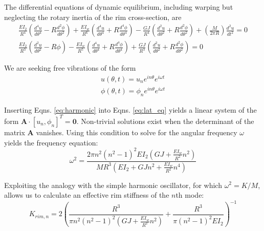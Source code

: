 \documentclass[../thesis.tex]{subfiles}
\begin{document}
The differential equations of dynamic equilibrium, including warping but neglecting the rotary inertia of the rim cross-section, are
  \begin{subequations}\label{eq:lat_eq}
  \begin{align}
  \frac{EI_{2}}{R^4}\left(\frac{d^4u}{d\theta^4}-R\frac{d^2\phi}{d\theta^2}\right) +
  \frac{EI_w}{R^6} \left(\frac{d^4u}{d\theta^4}+R\frac{d^4\phi}{d\theta^4}\right) -
  \frac{GJ}{R^4}\left(\frac{d^2u}{d\theta^2}+R\frac{d^2\phi}{d\theta^2}\right) +
  \left(\frac{M}{2\pi R}\right) \frac{d^2u}{dt^2} = 0\\
  \frac{EI_{2}}{R^3}\left(\frac{d^2u}{d\theta^2}-R\phi\right) -
  \frac{EI_w}{R^5}\left(\frac{d^4u}{d\theta^4}+R\frac{d^4\phi}{d\theta^4}\right) +
  \frac{GJ}{R^3}\left(\frac{d^2u}{d\theta^2}+R\frac{d^2\phi}{d\theta^2}\right) = 0
  \end{align}
  \end{subequations}

We are seeking free vibrations of the form
  \begin{subequations}\label{eq:harmonic}
  \begin{align}
  u(\theta, t)=u_n e^{in\theta}e^{i\omega t}\\
  \phi(\theta, t)=\phi_n e^{in\theta}e^{i\omega t}
  \end{align}
  \end{subequations}

Inserting Eqns. \eqref{eq:harmonic} into Eqns. \eqref{eq:lat_eq} yields a linear system of the form $\mathbf{A}\cdot [u_n, \phi_n]^T=\mathbf{0}$. Non-trivial solutions exist when the determinant of the matrix $\mathbf{A}$ vanishes. Using this condition to solve for the angular frequency $\omega$ yields the frequency equation:
  \begin{equation}\label{eq:omega}
  \omega^2 = \frac{2\pi n^2(n^2-1)^2EI_{2}\left(GJ + \frac{EI_w}{R^2}n^2 \right)}
                  {MR^3 \left( EI_{2} + GJn^2 + \frac{EI_w}{R^2}n^4\right)}
  \end{equation}

Exploiting the analogy with the simple harmonic oscillator, for which $\omega^2=K/M$, allows us to calculate an effective rim stiffness of the $n$th mode:
  \begin{equation}\label{eq:keff}
  K_{rim,n} = 2 \left( \frac{R^3}{\pi n^2(n^2-1)^2\left( GJ + \frac{EI_w}{R^2}n^2\right)} +
    \frac{R^3}{\pi(n^2-1)^2EI_{2}} \right)^{-1}
  \end{equation}
\end{document}
